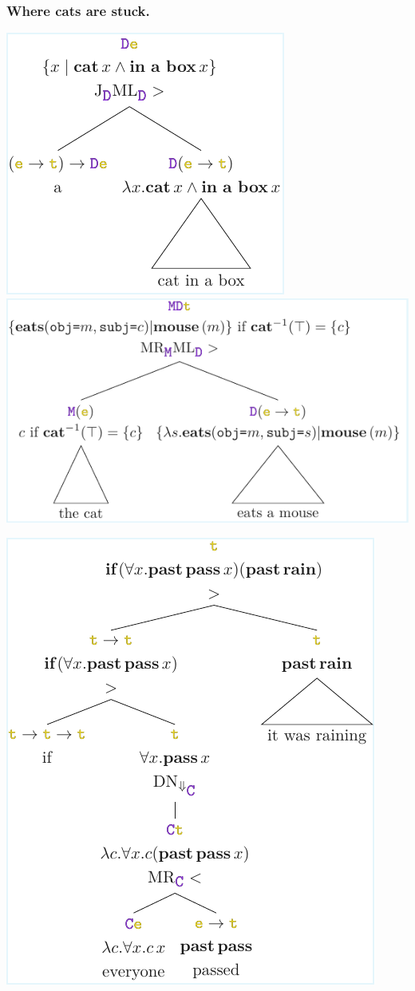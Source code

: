 \documentclass[math, english, info]{beamercours}
\begin{document}
\begin{frame}
	\frametitle{Where cats are stuck.}
	\includegraphics{aux/figures/parse-tree-1.pdf}
	\centering
	\includegraphics{aux/figures/parse-tree-2.pdf}

	{\centering \includegraphics[height=.7\pageheight]{aux/figures/parse-tree-3.pdf}}
\end{frame}
\end{document}
